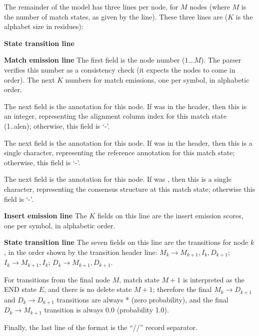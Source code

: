 The remainder of the model has three lines per node, for $M$ nodes
(where $M$ is the number of match states, as given by the 
line). These three lines are ($K$ is the alphabet size in residues):

\begin{sreitems}{\textbf{State transition line}}

\item [\textbf{Match emission line}] The first field is the node
number ($1 \ldots M$).  The parser verifies this number as a
consistency check (it expects the nodes to come in order). The next
$K$ numbers for match emissions, one per symbol, in alphabetic order.

The next field is the  annotation for this node.  If
 was  in the header, then this is an integer,
representing the alignment column index for this match state
(1..alen); otherwise, this field is `-'.

The next field is the  annotation for this node.  If
 was  in the header, then this is a single
character, representing the reference annotation for this match state;
otherwise, this field is `-'.

The next field is the  annotation for this node.  If
 was , then this is a single character,
representing the consensus structure at this match state; otherwise
this field is `-'.

\item [\textbf{Insert emission line}] The $K$ fields on this line are
the insert emission scores, one per symbol, in alphabetic order.

\item [\textbf{State transition line}] The seven fields on this line
are the transitions for node $k$, in the order shown by the transition
header line: $M_k \rightarrow M_{k+1}, I_{k}, D_{k+1}$; $ I_k
\rightarrow M_{k+1}, I_k$; $D_{k} \rightarrow M_{k+1}, D_{k+1}$.

For transitions from the final node $M$, match state $M+1$ is
interpreted as the END state $E$, and there is no delete state $M+1$;
therefore the final $M_k \rightarrow D_{k+1}$ and $D_k \rightarrow
D_{k+1}$ transitions are always * (zero probability), and the final
$D_k \rightarrow M_{k+1}$ transition is always 0.0 (probability 1.0).
\end{sreitems}

Finally, the last line of the format is the ``//'' record separator.

